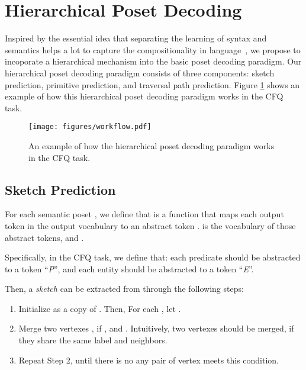 \documentclass{article}
\begin{document}
\section{Hierarchical Poset Decoding}
\label{sec:HPD}

Inspired by the essential idea that separating the learning of syntax and semantics helps a lot to capture the compositionality in language~\citep{russin2019compositional, li2019compositional, lake2019compositional, gordon2020permutation}, we propose to incoporate a hierarchical mechanism into the basic poset decoding paradigm.
Our hierarchical poset decoding paradigm consists of three components:
sketch prediction, primitive prediction, and traversal path prediction.
Figure \ref{fig:workflow} shows an example of how this hierarchical poset decoding paradigm works in the CFQ task.

\begin{figure}
\centering
\texttt{[image: figures/workflow.pdf]}
\caption{An example of how the hierarchical poset decoding paradigm works in the CFQ task.}
\label{fig:workflow}
\end{figure}





\subsection{Sketch Prediction}
\label{sec:sketch_prediction}

For each semantic poset , we define that  is a function that maps each output token  in the output vocabulary to an abstract token .
 is the vocabulary of those abstract tokens, and .

Specifically, in the CFQ task, we define that: each predicate  should be abstracted to a token ``\emph{P}'', and each entity  should be abstracted to a token ``\emph{E}''.

Then, a \emph{sketch}  can be extracted from  through the following steps:

\begin{enumerate}
\item Initialize  as a copy of . Then, For each , let .
\item Merge two vertexes , if ,  and .
Intuitively, two vertexes should be merged, if they share the same label and neighbors.
\item Repeat Step 2, until there is no any pair of vertex meets this condition.
\end{enumerate}
\end{document}
